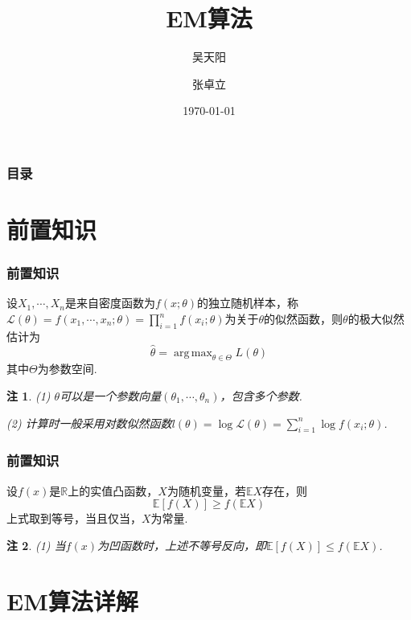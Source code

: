 \documentclass[UTF8]{ctexbeamer}
\title{EM算法}
\author{吴天阳\and 张卓立}
\institute{XJTU\and 强基数学}
\date{\today}  %
\DeclareMathOperator*{\argmax}{arg\,max}  %
\let\leq=\leqslant %
\let\geq=\geqslant %
\newtheorem{remark}{注}
\numberwithin{equation}{section}  %
\def\R{\mathbb{R}}          %
\def\E{\mathbb{E}}          %
\def\L{\mathcal{L}}         %
\begin{document}
\frame{\titlepage}  %

\begin{frame}
    \frametitle{目录}
    \tableofcontents
\end{frame}

\section{前置知识}
\begin{frame}
    \frametitle{前置知识}

    \begin{definition}[极大似然估计]
        设$X_1,\cdots,X_n$是来自密度函数为$f(x;\theta)$的独立随机样本，称$\L(\theta) = f(x_1,\cdots, x_n;\theta) = \prod_{i=1}^nf(x_i;\theta)$为关于$\theta$的\alert{似然函数}，则$\theta$的极大似然估计为
        \begin{equation*}
            \hat{\theta} = \argmax_{\theta\in \Theta} L(\theta)
        \end{equation*}
        其中$\Theta$为参数空间.
    \end{definition}\pause
    \begin{remark}
        (1) $\theta$可以是一个参数向量$(\theta_1,\cdots, \theta_n)$，包含多个参数.

        (2) 计算时一般采用\alert{对数似然函数}$l(\theta) = \log\L(\theta) = \sum_{i=1}^n\log f(x_i;\theta)$.
    \end{remark}
\end{frame}

\begin{frame}
    \frametitle{前置知识}

    \begin{theorem}[Jensen不等式]
        设$f(x)$是$\R$上的实值凸函数，$X$为随机变量，若$\E X$存在，则
        \begin{equation*}
            \E[f(X)]\geq f(\E X)
        \end{equation*}
        上式取到等号，当且仅当，$X$为常量.
    \end{theorem}\pause
    \begin{remark}
        (1) 当$f(x)$为凹函数时，上述不等号反向，即$\E[f(X)]\leq f(\E X)$.
    \end{remark}
\end{frame}

\section{EM算法详解}
\end{document}
